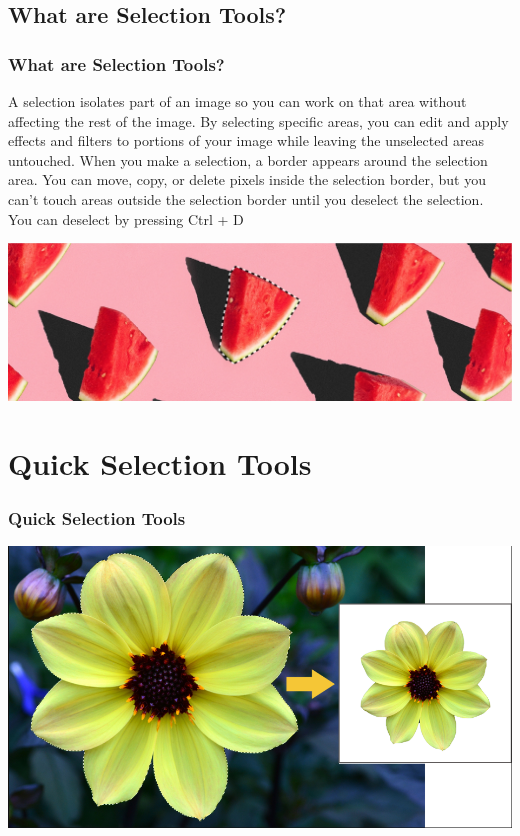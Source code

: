 \documentclass{beamer}
\begin{document}
			\subsection{What are Selection Tools?}		
	\begin{frame}
		\frametitle{What are Selection Tools?}
	\begin{outline}
		\1 A selection isolates part of an image so you can work on that area without affecting the rest of the image.
		\1 By selecting specific areas, you can edit and apply effects and filters to portions of your image while leaving the unselected areas untouched.
		\1 When you make a selection, a border appears around the selection area. 
		\1 You can move, copy, or delete pixels inside the selection border, but you can’t touch areas outside the selection border until you deselect the selection. 
		\2 You can deselect by pressing Ctrl + D
	\end{outline}
\begin{center}
	\includegraphics[width=.7\textwidth]{images/whats-new-detail-auto-select-an-object-on-hover-ps-23.0-max-oct2021.jpg.img.jpg}
	\end{center}
		\end{frame}

	
	\section{Quick Selection Tools}
	\begin{frame}
		\frametitle{Quick Selection Tools}
		\begin{center}
			\includegraphics[width = 1.0\textwidth]{images/selection1.png}
		\end{center}
	\end{frame}
\end{document}
